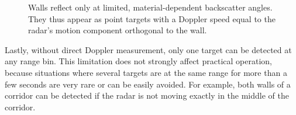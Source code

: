 \begin{figure}[htbp]
    \centering
    \def\svgwidth{5cm}
    
    \caption{Walls reflect only at limited, material-dependent backscatter angles. They thus appear as point targets with a Doppler speed equal to the radar's motion component orthogonal to the wall.}
    \label{fig:wall}
\end{figure}

Lastly, without direct Doppler measurement, only one target can be detected at any range bin. This limitation does not strongly affect practical operation, because situations where several targets are at the same range for more than a few seconds are very rare or can be easily avoided. For example, both walls of a corridor can be detected if the radar is not moving exactly in the middle of the corridor.
